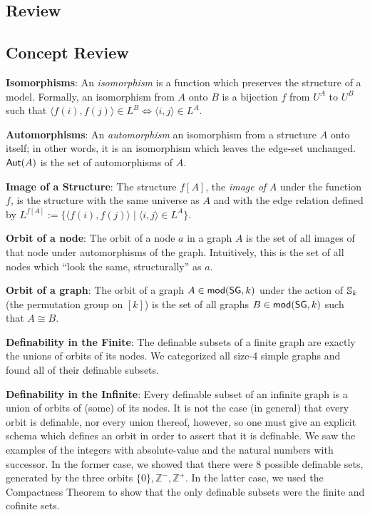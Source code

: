 \subsection{Review}
\begin{mdframed}[linewidth=1]
\section*{Concept Review}
\textbf{Isomorphisms}: An \emph{isomorphism} is a function which preserves the structure of a model. Formally, an isomorphism from $A$ onto $B$ is a bijection $f$ from $U^A$ to $U^B$ such that $\langle f(i), f(j) \rangle \in L^B \iff \langle i, j \rangle \in L^A$. 

\textbf{Automorphisms}: An \emph{automorphism} an isomorphism from a structure $A$ onto itself; in other words, it is an isomorphism which leaves the edge-set unchanged. $\mbox{$\mathsf{Aut}(A)$}$ is the set of automorphisms of $A$.


\textbf{Image of a Structure}: The structure $f[A]$, the \emph{image of} $A$ under the function $f$, is the structure with the same universe as $A$ and with the edge relation defined by $L^{f[A]} := \{\langle f(i), f(j) \rangle \mid \langle i, j \rangle \in L^A\}$. 

\textbf{Orbit of a node}: The orbit of a node $a$ in a graph $A$ is the set of all images of that node under automorphisms of the graph. Intuitively, this is the set of all nodes which ``look the same, structurally'' as $a$. 

\textbf{Orbit of a graph}: The orbit of a graph $A\in\mbox{$\mathsf{mod}(\mbox{$\mathsf{SG}$},k)$}$  under the action of $\mbox{$\mathbb{S}_{k}$}$ (the permutation group on $[k]$) is the set of all graphs $B\in\mbox{$\mathsf{mod}(\mbox{$\mathsf{SG}$},k)$}$ such that $A\cong B$.%

\textbf{Definability in the Finite}: The definable subsets of a finite graph are exactly the unions of orbits of its nodes. We categorized all size-4 simple graphs and found all of their definable subsets. 

\textbf{Definability in the Infinite}: Every definable subset of an infinite graph is a union of orbits of (some) of its nodes. It is not the case (in general) that every orbit is definable, nor every union thereof, however, so one must give an explicit schema which defines an orbit in order to assert that it is definable. We saw the examples of the integers with absolute-value and the natural numbers with successor. In the former case, we showed that there were $8$ possible definable sets, generated by the three orbits $\{0\}, \mathbb{Z}^{-}, \mathbb{Z}^{+}$. In the latter case, we used the Compactness Theorem to show that the only definable subsets were the finite and cofinite sets. 


\end{mdframed}
